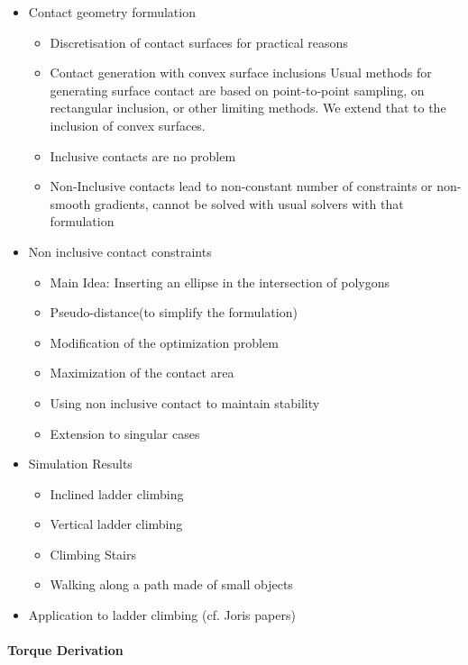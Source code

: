 \begin{itemize}
  \item Contact geometry formulation
    \begin{itemize}
      \item Discretisation of contact surfaces for practical reasons
      \item Contact generation with convex surface inclusions
Usual methods for generating surface contact are based on point-to-point sampling, on rectangular inclusion, or other limiting methods. We extend that to the inclusion of convex surfaces.
      \item Inclusive contacts are no problem
      \item Non-Inclusive contacts lead to non-constant number of constraints or non-smooth gradients, cannot be solved with usual solvers with that formulation
    \end{itemize}
  \item{Non inclusive contact constraints}
    \begin{itemize}
      \item {Main Idea: Inserting an ellipse in the intersection of polygons}
      \item {Pseudo-distance(to simplify the formulation)}
      \item {Modification of the optimization problem}
      \item {Maximization of the contact area}
      \item {Using non inclusive contact to maintain stability}
      \item {Extension to singular cases}
    \end{itemize}
  \item{Simulation Results}
    \begin{itemize}
      \item{Inclined ladder climbing}
      \item{Vertical ladder climbing}
      \item{Climbing Stairs}
      \item{Walking along a path made of small objects}
    \end{itemize}
  \item{Application to ladder climbing (cf. Joris papers)}
\end{itemize}

\paragraph{Torque Derivation}

